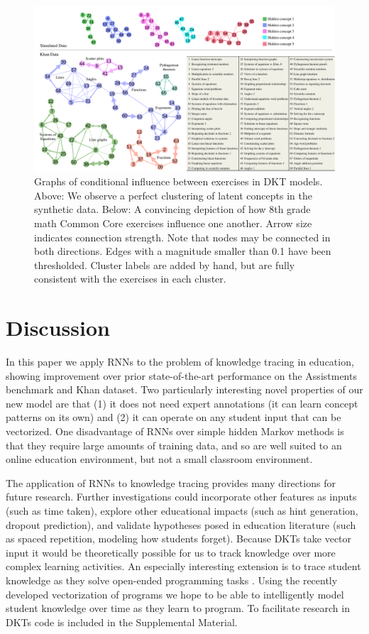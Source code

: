 \begin{figure}[t]
\centering
\includegraphics[width=1.0\textwidth]{img/conceptClusters}
\caption{Graphs of conditional influence between exercises in  DKT models. Above: We observe a perfect clustering of latent concepts in the synthetic data. Below: A convincing depiction of how 8th grade math Common Core exercises influence one another.
Arrow size indicates connection strength. Note that nodes may be connected in both directions. Edges with a magnitude smaller than 0.1 have been thresholded. Cluster labels are added by hand, but are fully consistent with the exercises in each cluster.
\label{fig:conceptClusters}
}

\end{figure}


\section{Discussion}

In this paper we apply RNNs to the problem of knowledge tracing in education, showing improvement over prior state-of-the-art performance on the Assistments benchmark and Khan dataset.
Two particularly interesting novel properties of our new model are that (1) it does not need expert annotations (it can learn concept patterns on its own) and (2) it can operate on any student input that can be vectorized. One disadvantage of RNNs over simple hidden Markov methods is that they require large amounts of training data, and so are well suited to an online education environment, but not a small classroom environment. 

The application of RNNs to knowledge tracing provides many directions for future research. Further investigations could incorporate other features as inputs (such as time taken), explore other educational impacts (such as hint generation, dropout prediction), and validate hypotheses posed in education literature (such as spaced repetition, modeling how students forget).
Because DKTs take vector input it would be theoretically possible for us to track knowledge over more complex learning activities.
An especially interesting extension is to trace student knowledge as they solve open-ended programming tasks \cite{piech2015autonomously,piech2012modeling}.
Using the recently developed vectorization of programs \cite{piechICML15} we hope to be able to intelligently model student knowledge over time as they learn to program.  To facilitate research in DKTs code is included in the Supplemental Material. 

